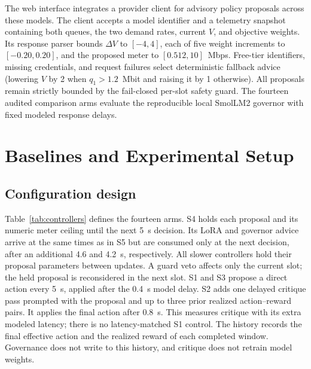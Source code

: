 \documentclass[conference]{IEEEtran}
\begin{document}
The web interface integrates a provider client for advisory policy proposals across these models. The client accepts a model identifier and a telemetry snapshot containing both queues, the two demand rates, current \(V\), and objective weights. Its response parser bounds \(\Delta V\) to \([-4,4]\), each of five weight increments to \([-0.20,0.20]\), and the proposed meter to \([0.512,10]\)~Mbps. Free-tier identifiers, missing credentials, and request failures select deterministic fallback advice (lowering \(V\) by 2 when \(q_1>1.2\)~Mbit and raising it by 1 otherwise). All proposals remain strictly bounded by the fail-closed per-slot safety guard. The fourteen audited comparison arms evaluate the reproducible local SmolLM2 governor with fixed modeled response delays.



\section{Baselines and Experimental Setup}\label{sec:design}
\subsection{Configuration design}
Table~\ref{tab:controllers} defines the fourteen arms. S4 holds each proposal and its numeric meter ceiling until the next 5~s decision. Its LoRA and governor advice arrive at the same times as in S5 but are consumed only at the next decision, after an additional 4.6 and 4.2~s, respectively. All slower controllers hold their proposal parameters between updates. A guard veto affects only the current slot; the held proposal is reconsidered in the next slot. S1 and S3 propose a direct action every 5~s, applied after the 0.4~s model delay. S2 adds one delayed critique pass prompted with the proposal and up to three prior realized action--reward pairs. It applies the final action after 0.8~s. This measures critique with its extra modeled latency; there is no latency-matched S1 control. The history records the final effective action and the realized reward of each completed window. Governance does not write to this history, and critique does not retrain model weights.
\end{document}
